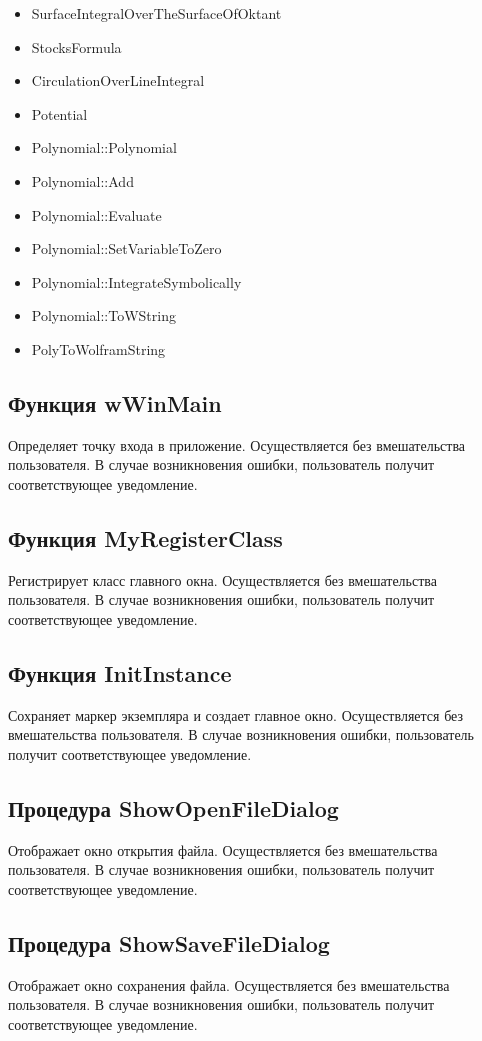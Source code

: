 \documentclass[14pt,a4paper,final]{extreport}
\begin{document}
\begin{itemize}
	\item  SurfaceIntegralOverTheSurfaceOfOktant
	\item  StocksFormula
	\item  CirculationOverLineIntegral
	\item  Potential
	\item  Polynomial::Polynomial
	\item  Polynomial::Add
	\item  Polynomial::Evaluate
	\item  Polynomial::SetVariableToZero
	\item  Polynomial::IntegrateSymbolically
	\item  Polynomial::ToWString
	\item  PolyToWolframString
\end{itemize}

\subsection{Функция wWinMain}
Определяет точку входа в приложение. Осуществляется без вмешательства пользователя. 
В случае возникновения ошибки, пользователь получит соответствующее уведомление.

\subsection{Функция MyRegisterClass}
Регистрирует класс главного окна. Осуществляется без вмешательства пользователя. 
В случае возникновения ошибки, пользователь получит соответствующее уведомление.

\subsection{Функция InitInstance}
Сохраняет маркер экземпляра и создает главное окно. Осуществляется без вмешательства пользователя. 
В случае возникновения ошибки, пользователь получит соответствующее уведомление.

\subsection{Процедура ShowOpenFileDialog}
Отображает окно открытия файла. Осуществляется без вмешательства пользователя. 
В случае возникновения ошибки, пользователь получит соответствующее уведомление.

\subsection{Процедура ShowSaveFileDialog}
Отображает окно сохранения файла. Осуществляется без вмешательства пользователя. 
В случае возникновения ошибки, пользователь получит соответствующее уведомление.
\end{document}
